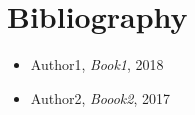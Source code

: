 \chapter{Bibliography} 

\begin{itemize}
    \item Author1, \textit{Book1}, 2018
    \item Author2, \textit{Boook2}, 2017
\end{itemize}
